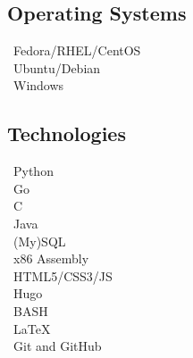 \documentclass{article}
\begin{document}
\begin{paracol}{2}
    \begin{tcolorbox}
        \subsection*{Operating Systems}
        \textcolor[HTML]{EE0000}{\faRedhat} \ Fedora/RHEL/CentOS \\
        \textcolor[HTML]{E95420}{\faUbuntu} \ Ubuntu/Debian \\
        \textcolor[HTML]{0078D6}{\faWindows} \ Windows
    \end{tcolorbox}

    \begin{tcolorbox}
        \subsection*{Technologies}
        \faPython \ Python \\
        \faGoogle \ Go \\
        \faFileCode \ C \\
        \faJava \ Java \\
        \faDatabase \ (My)SQL \\
        \faMicrochip \ x86 Assembly \\
        \faCode \ HTML5/CSS3/JS \\
        \faGlobe \ Hugo \\
        \faTerminal \ BASH \\
        \faFilePdf \ LaTeX \\
        \faGithub \ Git and GitHub
    \end{tcolorbox}

    \vspace{60pt}

    \begin{center}
        \hypersetup{urlcolor=black}
    \end{center}
\end{paracol}
\end{document}
